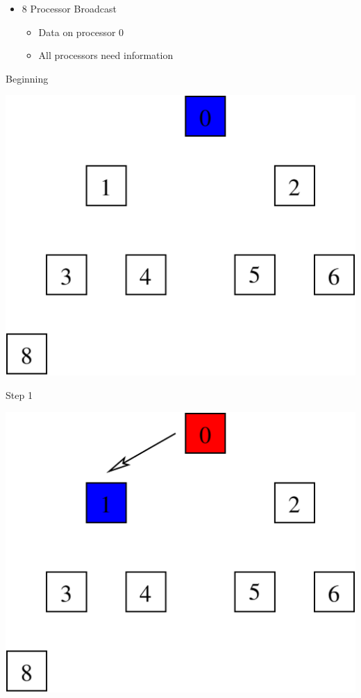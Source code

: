 \documentclass[compress,12pt]{beamer}
\begin{document}
\begin{frame}%
  \begin{itemize}
    \item 8 Processor Broadcast
    \begin{itemize}
      \item Data on processor 0
      \item All processors need information
    \end{itemize}
  \end{itemize}

  {
    \begin{minipage}{.2\textwidth}
      Beginning
    \end{minipage}
    \begin{minipage}{.8\textwidth}
      \includegraphics[width=.7\textwidth]{figures/bcast-1}
    \end{minipage}
  }
  {
    \begin{minipage}{.2\textwidth}
      Step 1
    \end{minipage}
    \begin{minipage}{.8\textwidth}
      \includegraphics[width=.7\textwidth]{figures/bcast0}

\end{minipage}}
\end{frame}
\end{document}
